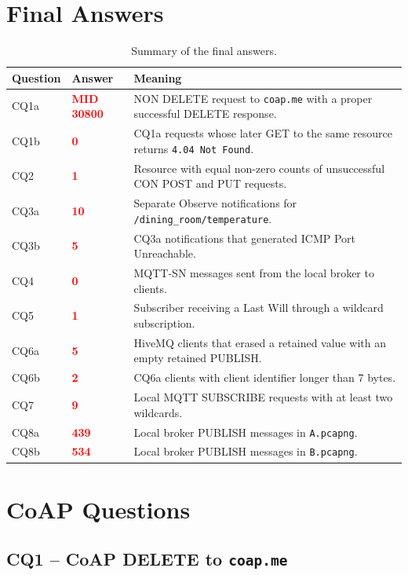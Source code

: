 \documentclass[a4paper,11pt]{article}
\newcommand{\answer}[1]{\textbf{\textcolor{red}{#1}}}
\newcommand{\code}[1]{\texttt{#1}}
\begin{document}
\section{Final Answers}
\begin{table}[H]
\centering
\caption{Summary of the final answers.}
\begin{tabularx}{\textwidth}{@{}l l X@{}}
\toprule
\textbf{Question} & \textbf{Answer} & \textbf{Meaning} \\
\midrule
CQ1a & \answer{MID 30800} & NON DELETE request to \code{coap.me} with a proper successful DELETE response. \\
CQ1b & \answer{0} & CQ1a requests whose later GET to the same resource returns \code{4.04 Not Found}. \\
CQ2 & \answer{1} & Resource with equal non-zero counts of unsuccessful CON POST and PUT requests. \\
CQ3a & \answer{10} & Separate Observe notifications for \code{/dining\_room/temperature}. \\
CQ3b & \answer{5} & CQ3a notifications that generated ICMP Port Unreachable. \\
CQ4 & \answer{0} & MQTT-SN messages sent from the local broker to clients. \\
CQ5 & \answer{1} & Subscriber receiving a Last Will through a wildcard subscription. \\
CQ6a & \answer{5} & HiveMQ clients that erased a retained value with an empty retained PUBLISH. \\
CQ6b & \answer{2} & CQ6a clients with client identifier longer than 7 bytes. \\
CQ7 & \answer{9} & Local MQTT SUBSCRIBE requests with at least two wildcards. \\
CQ8a & \answer{439} & Local broker PUBLISH messages in \code{A.pcapng}. \\
CQ8b & \answer{534} & Local broker PUBLISH messages in \code{B.pcapng}. \\
\bottomrule
\end{tabularx}
\end{table}

\newpage
\section{CoAP Questions}

\subsection{CQ1 -- CoAP DELETE to \code{coap.me}}
\end{document}
